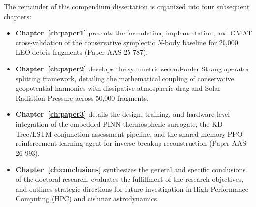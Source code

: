 The remainder of this compendium dissertation is organized into four subsequent chapters:
\begin{itemize}
    \item \textbf{Chapter~\ref{ch:paper1}} presents the formulation, implementation, and GMAT cross-validation of the conservative symplectic $N$-body baseline for 20,000 LEO debris fragments (Paper AAS 25-787).
    \item \textbf{Chapter~\ref{ch:paper2}} develops the symmetric second-order Strang operator splitting framework, detailing the mathematical coupling of conservative geopotential harmonics with dissipative atmospheric drag and Solar Radiation Pressure across 50,000 fragments.
    \item \textbf{Chapter~\ref{ch:paper3}} details the design, training, and hardware-level integration of the embedded PINN thermospheric surrogate, the KD-Tree/LSTM conjunction assessment pipeline, and the shared-memory PPO reinforcement learning agent for inverse breakup reconstruction (Paper AAS 26-993).
    \item \textbf{Chapter~\ref{ch:conclusions}} synthesizes the general and specific conclusions of the doctoral research, evaluates the fulfillment of the research objectives, and outlines strategic directions for future investigation in High-Performance Computing (HPC) and cislunar astrodynamics.
\end{itemize}